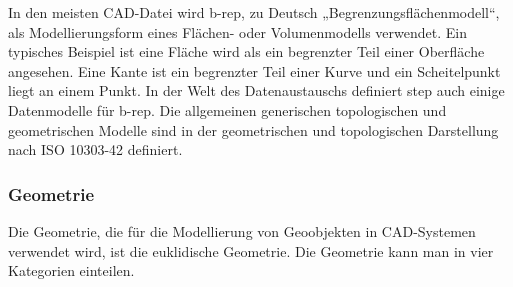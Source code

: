 \documentclass[14pt,a4paper,titlepage]{article}
\begin{document}
		\bigbreak
		In den meisten CAD-Datei wird \acf{b-rep}, zu Deutsch „Begrenzungsflächenmodell“, als Modellierungsform eines Flächen- oder Volumenmodells verwendet. Ein typisches Beispiel ist eine Fläche wird als ein begrenzter Teil einer Oberfläche angesehen. Eine Kante ist ein begrenzter Teil einer Kurve und ein Scheitelpunkt liegt an einem Punkt. In der Welt des Datenaustauschs definiert \acf{step} auch einige Datenmodelle für \acs{b-rep}. Die allgemeinen generischen topologischen und geometrischen Modelle sind in der geometrischen und topologischen Darstellung nach ISO 10303-42 definiert\cite{b-rep}.
		    
	\subsubsection{Geometrie}
		Die Geometrie, die für die Modellierung von Geoobjekten in CAD-Systemen verwendet wird, ist die euklidische Geometrie. Die Geometrie kann man in vier Kategorien einteilen.
\end{document}

